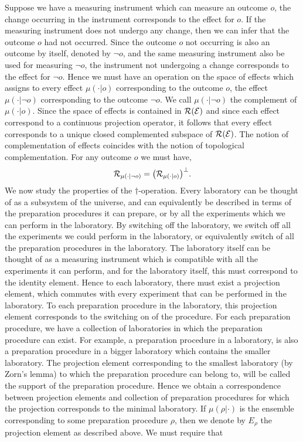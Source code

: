 \documentclass[11pt]{article}
\begin{document}
Suppose we have a measuring instrument which can measure an outcome $o$, the change occurring in the instrument corresponds to the effect for $o$. If the measuring instrument does not undergo any change, then we can infer that the outcome $o$ had not occurred. Since the outcome $o$ not occurring is also an outcome by itself, denoted by $\neg o$, and the same measuring instrument also be used for measuring $\neg o$, the instrument not undergoing a change corresponds to the effect for $\neg o$. Hence we must have an operation on the space of effects which assigns to every effect $\mu(\cdot|o)$ corresponding to the outcome $o$, the effect $\mu(\cdot|{\neg o})$ corresponding to the outcome $\neg o$. We call $\mu(\cdot|{\neg o})$ the complement of $\mu(\cdot|o)$. Since the space of effects is contained in $\mathcal{R}(\mathcal{E})$ and since each effect correspond to a continuous projection operator, it follows that every effect corresponds to a unique closed complemented subspace of $\mathcal{R}(\mathcal{E})$. The notion of complementation of effects coincides with the notion of topological complementation. For any outcome $o$ we must have,
\[\mathcal{R}_{\mu(\cdot|\neg o)}=\big(\mathcal{R}_{\mu(\cdot|o)}\big)^\perp.\]
We now study the properties of the $\dagger$-operation.
\noindent Every laboratory can be thought of as a subsystem of the universe, and can equivalently be described in terms of the preparation procedures it can prepare, or by all the experiments which we can perform in the laboratory. By switching off the laboratory, we switch off all the experiments we could perform in the laboratory, or equivalently switch of all the preparation procedures in the laboratory. The laboratory itself can be thought of as a measuring instrument which is compatible with all the experiments it can perform, and for the laboratory itself, this must correspond to the identity element. Hence to each laboratory, there must exist a projection element, which commutes with every experiment that can be performed in the laboratory. To each preparation procedure in the laboratory, this projection element corresponds to the switching on of the procedure. For each preparation procedure, we have a collection of laboratories in which the preparation procedure can exist. For example, a preparation procedure in a laboratory, is also a preparation procedure in a bigger laboratory which contains the smaller laboratory. The projection element corresponding to the smallest laboratory (by Zorn's lemma) to which the preparation procedure can belong to, will be called the support of the preparation procedure. Hence we obtain a correspondence between projection elements and collection of preparation procedures for which the projection corresponds to the minimal laboratory. If $\mu(\rho|\cdot)$ is the ensemble corresponding to some preparation procedure $\rho$, then we denote by $E_\rho$ the projection element as described above. We must require that
\end{document}
